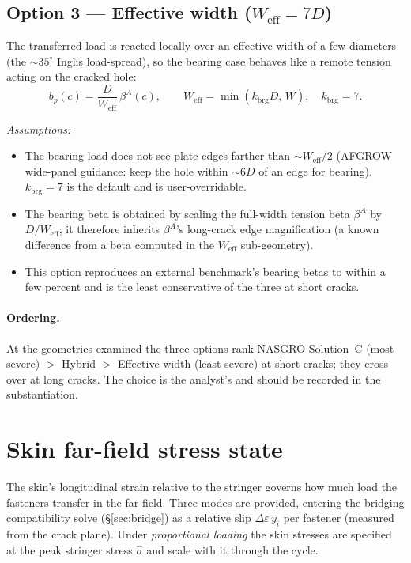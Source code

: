 \documentclass[11pt]{article}
\newenvironment{assume}{\par\smallskip\noindent\textit{Assumptions:}\begin{itemize}[leftmargin=1.5em,topsep=2pt,itemsep=1pt]}{\end{itemize}\par\smallskip}
\begin{document}
\subsection{Option 3 --- Effective width ($W_{\text{eff}}=7D$)}
The transferred load is reacted locally over an effective width of a few
diameters (the $\sim35^\circ$ Inglis load-spread), so the bearing case behaves
like a remote tension acting on the cracked hole:
\begin{equation}
b_p(c)=\frac{D}{W_{\text{eff}}}\,\beta^A(c),\qquad
W_{\text{eff}}=\min(k_{\text{brg}}D,\,W),\quad k_{\text{brg}}=7 .
\end{equation}
\begin{assume}
\item The bearing load does not see plate edges farther than $\sim$$W_{\text{eff}}/2$
  (AFGROW wide-panel guidance: keep the hole within $\sim6D$ of an edge for
  bearing). $k_{\text{brg}}=7$ is the default and is user-overridable.
\item The bearing beta is obtained by scaling the full-width tension beta
  $\beta^A$ by $D/W_{\text{eff}}$; it therefore inherits $\beta^A$'s
  long-crack edge magnification (a known difference from a beta computed in the
  $W_{\text{eff}}$ sub-geometry).
\item This option reproduces an external benchmark's bearing betas to within a
  few percent and is the least conservative of the three at short cracks.
\end{assume}

\paragraph{Ordering.} At the geometries examined the three options rank
NASGRO Solution~C (most severe) $>$ Hybrid $>$ Effective-width (least severe) at
short cracks; they cross over at long cracks. The choice is the analyst's and
should be recorded in the substantiation.

\section{Skin far-field stress state}
\label{sec:skin}

The skin's longitudinal strain relative to the stringer governs how much load
the fasteners transfer in the far field. Three modes are provided, entering the
bridging compatibility solve (\S\ref{sec:bridge}) as a relative slip
$\Delta\varepsilon\,y_i$ per fastener (measured from the crack plane). Under
\emph{proportional loading} the skin stresses are specified at the peak stringer
stress $\hat\sigma$ and scale with it through the cycle.
\end{document}
